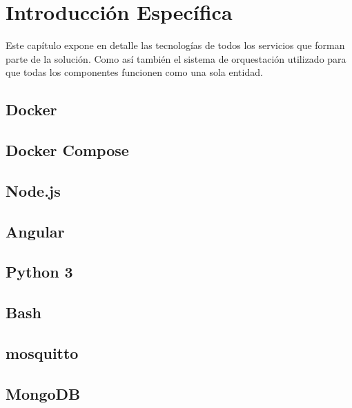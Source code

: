 \chapter{Introducción Específica}
\label{Chapter2}

Este capítulo expone en detalle las tecnologías de todos los servicios que forman parte de la solución. Como así también el sistema de orquestación utilizado para que todas los componentes funcionen como una sola entidad.

	\section{Docker}
	\label{ch2Docker}
	
	\section{Docker Compose}
	\label{ch2DockerCompose}
	
	\section{Node.js}
	\label{ch2Nodejs}

	\section{Angular}
	\label{ch2Angular}
	
	\section{Python 3}
	\label{ch2Python3}
	
	\section{Bash}
	\label{ch2Bash}
	
	\section{mosquitto}
	\label{ch2Mosquitto}
	
	\section{MongoDB}
	\label{ch2MongoDB}